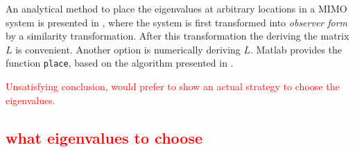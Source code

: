 An analytical method to place the eigenvalues at arbitrary locations in a MIMO system is presented in \cite[Section 4.2 B]{Antsaklis2006LinearSystems}, where the system is first transformed into \textit{observer form} by a similarity transformation. After this transformation the deriving the matrix $L$ is convenient. Another option is numerically deriving $L$. Matlab provides the function \texttt{place}, based on the algorithm presented in \cite{Kautsky1985RobustFeedback}.

\textcolor{red}{Unsatisfying conclusion, would prefer to show an actual strategy to choose the eigenvalues.}

\subsection{\textcolor{red}{what eigenvalues to choose}}


